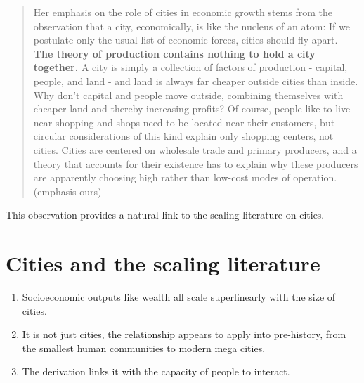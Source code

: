 \begin{quotation}
    Her emphasis on the role of cities in economic growth stems from the observation that a city, economically, is like the nucleus of an atom: If we postulate only the usual list of economic forces, cities should fly apart. \textbf{The theory of production contains nothing to hold a city together.} A city is simply a collection of factors of production - capital, people, and land - and land is always far cheaper outside cities than inside. Why don't capital and people move outside, combining themselves with cheaper land and thereby increasing profits? Of course, people like to live near shopping and shops need to be located near their customers, but circular considerations of this kind explain only shopping centers, not cities. Cities are centered on wholesale trade and primary producers, and a theory that accounts for their existence has to explain why these producers are apparently choosing high rather than low-cost modes of operation. (emphasis ours)
\end{quotation}

This observation provides a natural link to the scaling literature on cities.



\section{Cities and the scaling literature}

\begin{enumerate}
 \item Socioeconomic outputs like wealth all scale superlinearly with the size of cities. 
\item It is not just cities, the relationship appears to apply into pre-history, from the smallest human communities to modern mega cities. %
\item The derivation links it with the capacity of people to interact.
\end{enumerate}


